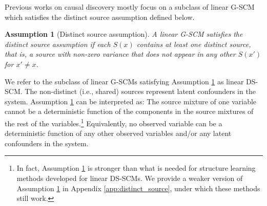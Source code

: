 \documentclass[12pt]{article}
\newtheorem{assumption}{Assumption}
\newcommand{\setX}{\mathcal{X}}
\newcommand{\setS}{\mathcal{S}}
\begin{document}
Previous works on causal discovery mostly focus on a subclass of linear G-SCM
which satisfies the distinct source assumption defined below.
\vspace{-2mm}
\begin{assumption}[Distinct source assumption]
\label{assumption:distinct_source}
A linear G-SCM satisfies the distinct source assumption if each $S(x)$ contains at least one distinct source, that is, a source with non-zero variance that does not appear in any other $S(x')$ for $x'\neq x$.
\end{assumption}
\vspace{-1mm}
We refer to the subclass of linear G-SCMs satisfying Assumption \ref{assumption:distinct_source} as linear DS-SCM.
The non-distinct (i.e., shared) sources represent latent confounders in the system. 
Assumption \ref{assumption:distinct_source} can be interpreted as:
The source mixture of one variable cannot be a deterministic function of the components in the source mixtures of the rest of the variables.\footnote{
In fact, Assumption \ref{assumption:distinct_source} is stronger than what is needed for structure learning methods developed for linear DS-SCMs. We provide a weaker version of Assumption \ref{assumption:distinct_source} in Appendix \ref{app:distinct_source}, under which these methods still work.}
Equivalently, no observed variable can be a deterministic function of any other observed variables and/or any latent confounders in the system.
\end{document}
